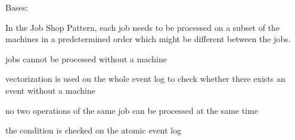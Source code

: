 \documentclass[letterpaper,10pt,english]{sphinxmanual}
\begin{document}
\begin{fulllineitems}
\label{\detokenize{event_log_analyzer:event_log_analyzer.pattern_library.manufacturing_scheduling_patterns.JobShop}}
\sphinxAtStartPar
Bases: {\hyperref[\detokenize{event_log_analyzer:event_log_analyzer.pattern_library.pattern.Pattern}]{}}

\sphinxAtStartPar
In the Job Shop Pattern, each job needs to be processed on a subset of the machines in a predetermined order which might be different between the jobs.

\begin{fulllineitems}
\label{\detokenize{event_log_analyzer:event_log_analyzer.pattern_library.manufacturing_scheduling_patterns.JobShop.cond_a}}
\sphinxAtStartPar
jobs cannot be processed without a machine

\sphinxAtStartPar
vectorization is used on the whole event log to check whether there exists an event without a machine

\end{fulllineitems}


\begin{fulllineitems}
\label{\detokenize{event_log_analyzer:event_log_analyzer.pattern_library.manufacturing_scheduling_patterns.JobShop.cond_b}}
\sphinxAtStartPar
no two operations of the same job can be processed at the same time

\sphinxAtStartPar
the condition is checked on the atomic event log

\end{fulllineitems}


\end{fulllineitems}
\end{document}
